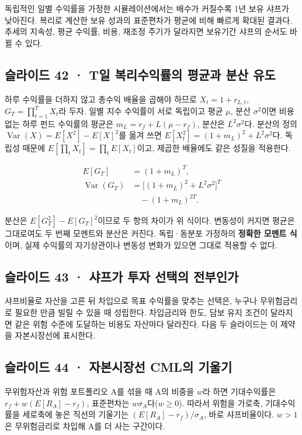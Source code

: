 \documentclass[11pt,a4paper]{article}
\begin{document}
독립적인 일별 수익률을 가정한 시뮬레이션에서는 배수가 커질수록 1년 보유 샤프가 낮아진다. 복리로 계산한 보유 성과의 표준편차가 평균에 비해 빠르게 확대된 결과다. 추세의 지속성, 평균 수익률, 비용, 재조정 주기가 달라지면 보유기간 샤프의 순서도 바뀔 수 있다.\par

\subsection{슬라이드 42 · T일 복리수익률의 평균과 분산 유도}
하루 수익률을 더하지 않고 총수익 배율을 곱해야 하므로 $X_t=1+r_{L,t}$, $G_T=\prod_{t=1}^{T}X_t$라 두자. 일별 지수 수익률이 서로 독립이고 평균 $\mu$, 분산 $\sigma^2$이면 비용 없는 하루 펀드 수익률의 평균은 $m_L=r_f+L(\mu-r_f)$, 분산은 $L^2\sigma^2$다. 분산의 정의 $\operatorname{Var}(X)=E[X^2]-E[X]^2$를 옮겨 쓰면 $E[X_t^2]=(1+m_L)^2+L^2\sigma^2$다. 독립성 때문에 $E[\prod_tX_t]=\prod_tE[X_t]$이고, 제곱한 배율에도 같은 성질을 적용한다.\par

\[
\begin{aligned}
E[G_T]&=(1+m_L)^T,\\
\operatorname{Var}(G_T)
&=\big[(1+m_L)^2+L^2\sigma^2\big]^T\\
&\quad-(1+m_L)^{2T}.
\end{aligned}
\]

분산은 $E[G_T^2]-E[G_T]^2$이므로 두 항의 차이가 위 식이다. 변동성이 커지면 평균은 그대로여도 두 번째 모멘트와 분산은 커진다. 독립·동분포 가정하의 \textbf{정확한 모멘트 식}이며, 실제 수익률의 자기상관이나 변동성 변화가 있으면 그대로 적용할 수 없다.\par

\subsection{슬라이드 43 · 샤프가 투자 선택의 전부인가}
샤프비율로 자산을 고른 뒤 차입으로 목표 수익률을 맞추는 선택은, 누구나 무위험금리로 필요한 만큼 빌릴 수 있을 때 성립한다. 차입금리와 한도, 담보 유지 조건이 달라지면 같은 위험 수준에 도달하는 비용도 자산마다 달라진다. 다음 두 슬라이드는 이 제약을 자본시장선에 표시한다.\par

\subsection{슬라이드 44 · 자본시장선 CML의 기울기}
무위험자산과 위험 포트폴리오 A를 섞을 때 A의 비중을 $w$라 하면 기대수익률은 $r_f+w(E[R_A]-r_f)$, 표준편차는 $w\sigma_A$다($w\geq0$). 따라서 위험을 가로축, 기대수익률을 세로축에 놓은 직선의 기울기는 $(E[R_A]-r_f)/\sigma_A$, 바로 샤프비율이다. $w>1$은 무위험금리로 차입해 A를 더 사는 구간이다.\par
\end{document}
